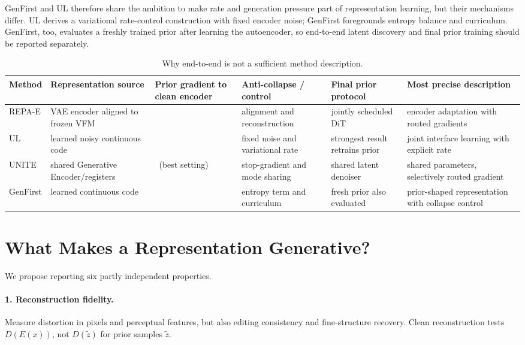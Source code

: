 \documentclass{article}
\newcommand{\yes}{\textcolor{decgreen}{\ding{51}}}
\newcommand{\no}{\textcolor{cautionred}{\ding{55}}}
\begin{document}
GenFirst and UL therefore share the ambition to make rate and generation pressure part of representation learning, but their mechanisms differ. UL derives a variational rate-control construction with fixed encoder noise; GenFirst foregrounds entropy balance and curriculum. GenFirst, too, evaluates a freshly trained prior after learning the autoencoder, so end-to-end latent discovery and final prior training should be reported separately.

\begin{table}[t]
\centering
\small
\setlength{\tabcolsep}{4pt}
\begin{tabularx}{\textwidth}{@{}p{1.45cm}p{2.3cm}p{2.15cm}p{2.1cm}p{2.15cm}X@{}}
\toprule
Method & Representation source & Prior gradient to clean encoder & Anti-collapse / control & Final prior protocol & Most precise description \\
\midrule
REPA-E & VAE encoder aligned to frozen VFM & \no & alignment and reconstruction & jointly scheduled DiT & encoder adaptation with routed gradients \\
UL & learned noisy continuous code & \yes & fixed noise and variational rate & strongest result retrains prior & joint interface learning with explicit rate \\
UNITE & shared Generative Encoder/registers & \no\ (best setting) & stop-gradient and mode sharing & shared latent denoiser & shared parameters, selectively routed gradient \\
GenFirst & learned continuous code & \yes & entropy term and curriculum & fresh prior also evaluated & prior-shaped representation with collapse control \\
\bottomrule
\end{tabularx}
\caption{Why end-to-end is not a sufficient method description.}
\label{tab:joint}
\end{table}

\section{What Makes a Representation Generative?}
\label{sec:criteria}

We propose reporting six partly independent properties.

\paragraph{1. Reconstruction fidelity.}
Measure distortion in pixels and perceptual features, but also editing consistency and fine-structure recovery. Clean reconstruction tests \(D(E(x))\), not \(D(\tilde z)\) for prior samples \(\tilde z\).
\end{document}
